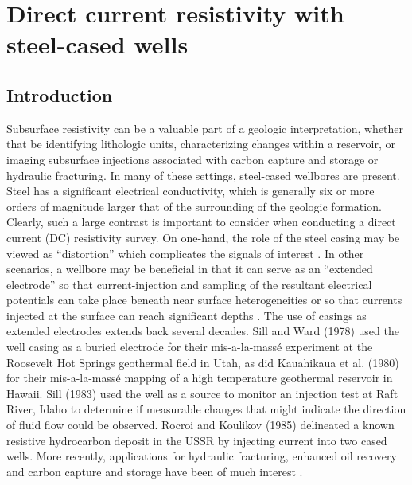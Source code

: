 
\chapter{Direct current resistivity with steel-cased wells}
\label{ch:casing-dc}

\section{Introduction}

Subsurface resistivity can be a valuable part of a geologic interpretation, whether that be identifying lithologic units, characterizing changes within a reservoir, or imaging subsurface injections associated with carbon capture and storage or hydraulic fracturing. In many of these settings, steel-cased wellbores are present. Steel has a significant electrical conductivity, which is generally six or more orders of magnitude larger that of the surrounding of the geologic formation. Clearly, such a large contrast is important to consider when conducting a direct current (DC) resistivity survey. On one-hand, the role of the steel casing may be viewed as ``distortion'' which complicates the signals of interest \citep{Wait1983, Holladay1984, Johnston1987}. In other scenarios, a wellbore may be beneficial in that it can serve as an ``extended electrode'' so that current-injection and sampling of the resultant electrical potentials can take place beneath near surface heterogeneities \citep{Ramirez1996, Rucker2010, Rucker2012, Ronczka2015} or so that currents injected at the surface can reach significant depths \citep{Schenkel1994, Weiss2016, hoversten2017borehole}. The use of casings as extended electrodes extends back several decades. Sill and Ward (1978) used the well casing as a buried electrode for their mis-a-la-mass\'e experiment at the Roosevelt Hot Springs geothermal field in Utah, as did Kauahikaua et al. (1980) for their mis-a-la-mass\'e mapping of a high temperature geothermal reservoir in Hawaii. Sill (1983) used the well as a source to monitor an injection test at Raft River, Idaho to determine if measurable changes that might indicate the direction of fluid flow could be observed. Rocroi and Koulikov (1985) delineated a known resistive hydrocarbon deposit in the USSR by injecting current into two cased wells. More recently, applications for hydraulic fracturing, enhanced oil recovery and carbon capture and storage have been of much interest \citep{Commer2015, Um2015, Weiss2016, hoversten2017borehole}.

